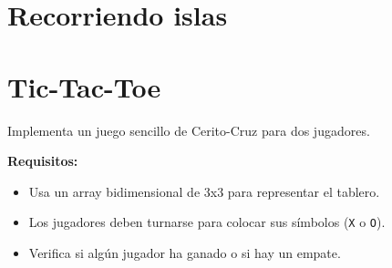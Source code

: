 \section{Recorriendo islas}


\section{Tic-Tac-Toe}
Implementa un juego sencillo de Cerito-Cruz para dos jugadores.

\textbf{Requisitos:}
\begin{itemize}
    \item Usa un array bidimensional de 3x3 para representar el tablero.
    \item Los jugadores deben turnarse para colocar sus símbolos (\texttt{X} o \texttt{O}).
    \item Verifica si algún jugador ha ganado o si hay un empate.
\end{itemize}







